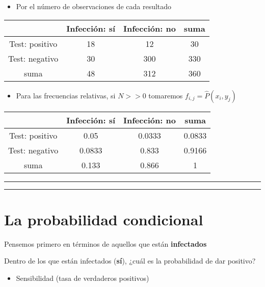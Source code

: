 \documentclass[
]{book}
\providecommand{\tightlist}{%
  \setlength{\itemsep}{0pt}\setlength{\parskip}{0pt}}
\begin{document}
\begin{itemize}
\tightlist
\item
  Por el número de observaciones de cada resultado
\end{itemize}

\begin{longtable}[]{@{}cccc@{}}
\toprule
& Infección: sí & Infección: no & suma \\
\midrule
\endhead
Test: positivo & 18 & 12 & 30 \\
Test: negativo & 30 & 300 & 330 \\
suma & 48 & 312 & 360 \\
\bottomrule
\end{longtable}

\begin{itemize}
\tightlist
\item
  Para las frecuencias relativas, si \(N>>0\) tomaremos \(f_{i,j}=\hat{P}(x_i, y_j)\)
\end{itemize}

\begin{longtable}[]{@{}cccc@{}}
\toprule
& Infección: sí & Infección: no & suma \\
\midrule
\endhead
Test: positivo & 0.05 & 0.0333 & 0.0833 \\
Test: negativo & 0.0833 & 0.833 & 0.9166 \\
suma & 0.133 & 0.866 & 1 \\
\bottomrule
\end{longtable}

\begin{center}\rule{0.5\linewidth}{0.5pt}\end{center}

\begin{center}\rule{0.5\linewidth}{0.5pt}\end{center}

\hypertarget{la-probabilidad-condicional}{%
\section{La probabilidad condicional}\label{la-probabilidad-condicional}}

Pensemos primero en términos de aquellos que están \textbf{infectados}

Dentro de los que están infectados (\textbf{sí}), ¿cuál es la probabilidad de dar positivo?

\begin{itemize}
\tightlist
\item
  Sensibilidad (tasa de verdaderos positivos)
\end{itemize}
\end{document}
